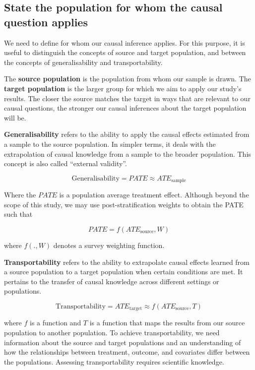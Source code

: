 \documentclass[
  singlecolumn]{report}
\begin{document}
\hypertarget{state-the-population-for-whom-the-causal-question-applies}{%
\subsection{\texorpdfstring{\textbf{State the population for whom the
causal question
applies}}{State the population for whom the causal question applies}}\label{state-the-population-for-whom-the-causal-question-applies}}

We need to define for whom our causal inference applies. For this
purpose, it is useful to distinguish the concepts of source and target
population, and between the concepts of generalisability and
transportability.

The \textbf{source population} is the population from whom our sample is
drawn. The \textbf{target population} is the larger group for which we
aim to apply our study's results. The closer the source matches the
target in ways that are relevant to our causal questions, the stronger
our causal inferences about the target population will be.

\textbf{Generalisability} refers to the ability to apply the causal
effects estimated from a sample to the source population. In simpler
terms, it deals with the extrapolation of causal knowledge from a sample
to the broader population. This concept is also called ``external
validity''.

\[\text{Generalisability} = PATE \approx ATE_{\text{sample}}\]

Where the \(PATE\) is a population average treatment effect. Although
beyond the scope of this study, we may use post-stratification weights
to obtain the PATE such that

\[PATE =  f(ATE_{\text{source}}, W)\]

where \(f(.,W)\) denotes a survey weighting function.

\textbf{Transportability} refers to the ability to extrapolate causal
effects learned from a source population to a target population when
certain conditions are met. It pertains to the transfer of causal
knowledge across different settings or populations.

\[\text{Transportability} = ATE_{\text{target}} \approx f(ATE_{\text{source}}, T)\]

where \(f\) is a function and \(T\) is a function that maps the results
from our source population to another population. To achieve
transportability, we need information about the source and target
populations and an understanding of how the relationships between
treatment, outcome, and covariates differ between the populations.
Assessing transportability requires scientific knowledge.
\end{document}

